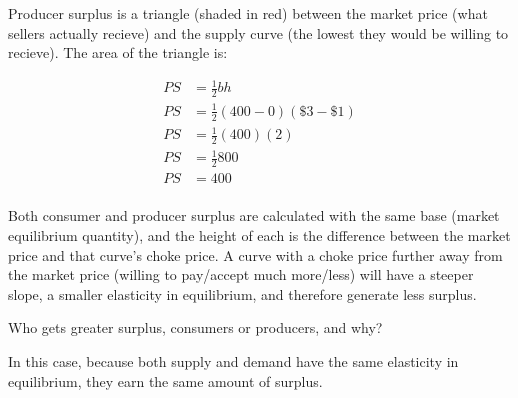 \documentclass[12 pt]{exam}
\begin{document}
\begin{questions}
\begin{solution}
Producer surplus is a triangle (shaded in red) between the market price (what sellers actually recieve) and the supply curve (the lowest they would be willing to recieve). The area of the triangle is:

$$\begin{aligned}
PS &=\frac{1}{2}bh\\
PS &=\frac{1}{2}(400-0)(\$3-\$1)\\
PS &=\frac{1}{2}(400)(2)\\
PS &=\frac{1}{2}800\\
PS &=400\\
\end{aligned}$$

Both consumer and producer surplus are calculated with the same base (market equilibrium quantity), and the height of each is the difference between the market price and that curve's choke price. A curve with a choke price further away from the market price (willing to pay/accept much more/less) will have a steeper slope, a smaller elasticity in equilibrium, and therefore generate less surplus.

\end{solution}

\question Who gets greater surplus, consumers or producers, and why?

\begin{solution}

In this case, because both supply and demand have the same elasticity in equilibrium, they earn the same amount of surplus.

\end{solution}

\end{questions}
\end{document}
